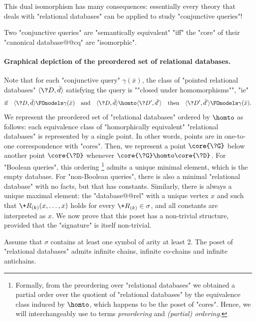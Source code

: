 This dual isomorphism has many consequences: essentially every theory that deals with
"relational databases" can be applied to study "conjunctive queries"!

\begin{corollary}
	Two "conjunctive queries" are "semantically equivalent" "iff"
	the "core" of their "canonical database@@cq" are "isomorphic".
\end{corollary}

\paragraph*{Graphical depiction of the preordered set of relational databases.}
Note that for each "conjunctive query" $\gamma(\bar x)$, the class of
"pointed relational databases" $\tup{\?D, \bar d}$ satisfying the query
is \AP""closed under homomorphisms"", "ie"
\[
	\text{if}\quad \tup{\?D, \bar d} \FOmodels \gamma(\bar x)
	\quad\text{and}\quad \tup{\?D, \bar d} \homto \tup{\?D', \bar d'}
	\quad\text{then}\quad \tup{\?D', \bar d'} \FOmodels \gamma(\bar x).
\]
We represent the preordered set of "relational databases" ordered by $\homto$ as follows:
each equivalence class of "homorphically equivalent" "relational databases" is
represented by a single point. In other words, points are in one-to-one correspondence
with "cores". Then, we represent a point $\core{\?G}$ below another point $\core{\?D}$
whenever $\core{\?G} \homto \core{\?D}$.
For "Boolean queries", this ordering%
\footnote{Formally, from the preordering over "relational databases" we obtained a partial
order over the quotient of "relational databases" by the equivalence class induced by $\homto$,
which happens to be the poset of "cores". Hence, we will interchangeably
use to terms \emph{preordering} and \emph{(partial) ordering}.}
admits a unique minimal element, which is the empty database.
For "non-Boolean queries", there is also a minimal "relational database" with
no facts, but that has constants.
Similarly, there is always a unique maximal element: the "database@@rel" with
a unique vertex $x$ and such that $\+R_{(k)}(x,\dotsc,x)$ holds for
every $\+R_{(k)} \in \sigma$, and all constants are interpreted as $x$.
We now prove that this poset has a non-trivial structure, provided that the "signature"
is itself non-trivial.

\begin{proposition}
	\AP\label{prop:poset-reldb}
	Assume that $\sigma$ contains at least one symbol of arity at least 2.
	The poset of "relational databases"
	admits infinite chains, infinite co-chains and infinite antichains.
\end{proposition}

